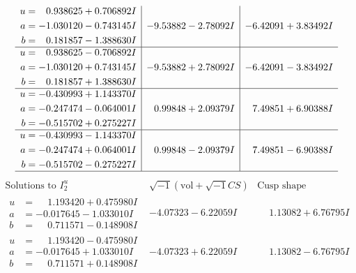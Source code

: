 \documentclass[1p]{elsarticle_modified}
\theoremstyle{definition}
\newcommand{\I}{\sqrt{-1}}
\begin{document}
$$\begin{array}{c|c|c}
\begin{aligned}
u &= \phantom{-}0.938625 + 0.706892 I \\
a &= -1.030120 - 0.743145 I \\
b &= \phantom{-}0.181857 - 1.388630 I\end{aligned}
 & -9.53882 - 2.78092 I & -6.42091 + 3.83492 I \\ \hline\begin{aligned}
u &= \phantom{-}0.938625 - 0.706892 I \\
a &= -1.030120 + 0.743145 I \\
b &= \phantom{-}0.181857 + 1.388630 I\end{aligned}
 & -9.53882 + 2.78092 I & -6.42091 - 3.83492 I \\ \hline\begin{aligned}
u &= -0.430993 + 1.143370 I \\
a &= -0.247474 - 0.064001 I \\
b &= -0.515702 + 0.275227 I\end{aligned}
 & \phantom{-}0.99848 + 2.09379 I & \phantom{-}7.49851 + 6.90388 I \\ \hline\begin{aligned}
u &= -0.430993 - 1.143370 I \\
a &= -0.247474 + 0.064001 I \\
b &= -0.515702 - 0.275227 I\end{aligned}
 & \phantom{-}0.99848 - 2.09379 I & \phantom{-}7.49851 - 6.90388 I\\
 \hline 
 \end{array}$$\newpage$$\begin{array}{c|c|c}  
\text{Solutions to }I^u_{2}& \I (\text{vol} + \sqrt{-1}CS) & \text{Cusp shape}\\
 \hline 
\begin{aligned}
u &= \phantom{-}1.193420 + 0.475980 I \\
a &= -0.017645 - 1.033010 I \\
b &= \phantom{-}0.711571 - 0.148908 I\end{aligned}
 & -4.07323 - 6.22059 I & \phantom{-}1.13082 + 6.76795 I \\ \hline\begin{aligned}
u &= \phantom{-}1.193420 - 0.475980 I \\
a &= -0.017645 + 1.033010 I \\
b &= \phantom{-}0.711571 + 0.148908 I\end{aligned}
 & -4.07323 + 6.22059 I & \phantom{-}1.13082 - 6.76795 I \\ \hline\begin{aligned}

\end{aligned}
\end{array}$$
\end{document}
